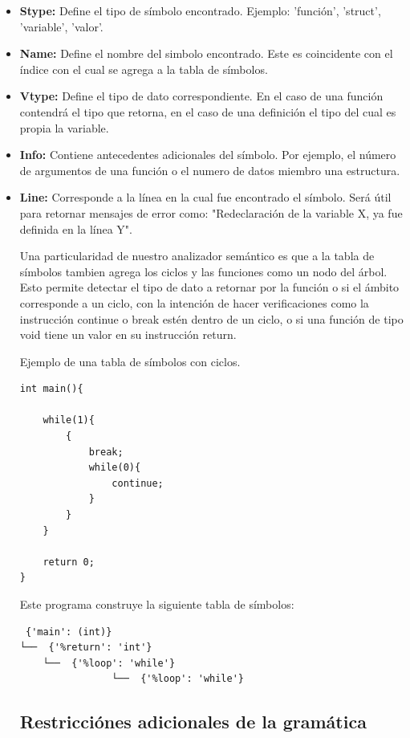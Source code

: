 \documentclass[12pt]{article}
\begin{document}
\begin{itemize}
    \item  \textbf{Stype:} Define el tipo de s\'imbolo encontrado. Ejemplo: 'funci\'on', 'struct', 'variable', 'valor'.
    \item  \textbf{Name:} Define el nombre del simbolo encontrado. Este es coincidente con el \'indice con el cual se agrega a la tabla de s\'imbolos.
    \item  \textbf{Vtype:} Define el tipo de dato correspondiente. En el caso de una funci\'on contendr\'a el tipo que retorna, en el caso de una definici\'on el tipo del cual es propia la variable. 
    \item  \textbf{Info:} Contiene antecedentes adicionales del s\'imbolo. Por ejemplo, el n\'umero de argumentos de una funci\'on o el numero de datos miembro una estructura. 
    \item  \textbf{Line:} Corresponde a la l\'inea en la cual fue encontrado el s\'imbolo. Ser\'a \'util para retornar mensajes de error como: "Redeclaraci\'on de la variable X, ya fue definida en la l\'inea Y". 

Una particularidad de nuestro analizador sem\'antico es que a la tabla de s\'imbolos tambien agrega los ciclos y las funciones como un nodo del \'arbol. Esto permite detectar el tipo de dato a retornar por la funci\'on o si el \'ambito corresponde a un ciclo, con la intenci\'on de hacer verificaciones como la instrucci\'on continue o break est\'en dentro de un ciclo, o si una funci\'on de tipo void tiene un valor en su instrucci\'on return.

Ejemplo de una tabla de s\'imbolos con ciclos.

\begin{verbatim}
int main(){

    while(1){
        {
            break;
            while(0){
                continue;
            }
        }
    }

    return 0;
}
\end{verbatim}

Este programa construye la siguiente tabla de s\'imbolos:
\begin{verbatim}
 {'main': (int)}
└──  {'%return': 'int'}
    └──  {'%loop': 'while'}
                └──  {'%loop': 'while'}
\end{verbatim}



\subsection*{Restricciónes adicionales de la gramática}


\end{itemize}
\end{document}
